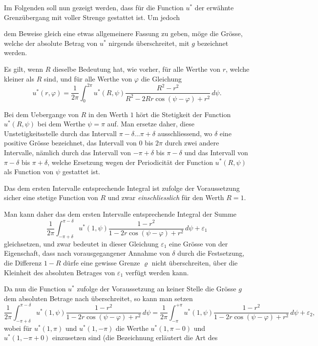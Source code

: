 \documentclass{article}
\begin{document}
Im Folgenden soll nun gezeigt werden, dass für die Function $u^*$ der erwähnte Grenzübergang mit voller Strenge gestattet ist. Um jedoch

dem Beweise gleich eine etwas allgemeinere Fassung zu geben, möge die Grösse, welche der absolute Betrag von $u^*$ nirgends überschreitet, mit $g$ bezeichnet werden.

Es gilt, wenn $R$ dieselbe Bedeutung hat, wie vorher, für alle Werthe von $r$, welche kleiner als $R$ sind, und für alle Werthe von $\varphi$ die Gleichung
\[
u^*(r, \varphi) = \frac{1}{2\pi} \int_0^{2\pi} u^*(R, \psi) \frac{R^2 - r^2}{R^2 - 2Rr \cos(\psi - \varphi) + r^2}\,d\psi.
\]

Bei dem Uebergange von $R$ in den Werth $1$ hört die Stetigkeit der Function $u^*(R, \psi)$ bei dem Werthe $\psi = \pi$ auf. Man ersetze daher, diese Unstetigkeitsstelle durch das Intervall $\pi - \delta \dots \pi + \delta$ ausschliessend, wo $\delta$ eine positive Grösse bezeichnet, das Intervall von $0$ bis $2\pi$ durch zwei andere Intervalle, nämlich durch das Intervall von $-\pi + \delta$ bis $\pi - \delta$ und das Intervall von $\pi - \delta$ bis $\pi + \delta$, welche Ersetzung wegen der Periodicität der Function $u^*(R, \psi)$ als Function von $\psi$ gestattet ist.

Das dem ersten Intervalle entsprechende Integral ist zufolge der Voraussetzung sicher eine stetige Function von $R$ und zwar \emph{einschliesslich} für den Werth $R = 1$.

Man kann daher das dem ersten Intervalle entsprechende Integral der Summe
\[
\frac{1}{2\pi} \int_{-\pi+\delta}^{\pi-\delta} u^*(1, \psi) \frac{1 - r^2}{1 - 2r \cos(\psi - \varphi) + r^2}\,d\psi + \varepsilon_1
\]
gleichsetzen, und zwar bedeutet in dieser Gleichung $\varepsilon_1$ eine Grösse von der Eigenschaft, dass nach vorausgegangener Annahme von $\delta$ durch die Festsetzung, die Differenz $1 - R$ dürfe eine gewisse Grenze $\varrho$ nicht überschreiten, über die Kleinheit des absoluten Betrages von $\varepsilon_1$ verfügt werden kann.

Da nun die Function $u^*$ zufolge der Voraussetzung an keiner Stelle die Grösse $g$ dem absoluten Betrage nach überschreitet, so kann man setzen
\[
\frac{1}{2\pi} \int_{-\pi+\delta}^{\pi-\delta} u^*(1, \psi) \frac{1 - r^2}{1 - 2r \cos(\psi - \varphi) + r^2}\,d\psi = \frac{1}{2\pi} \int_{-\pi}^{+\pi} u^*(1, \psi) \frac{1 - r^2}{1 - 2r \cos(\psi - \varphi) + r^2}\,d\psi + \varepsilon_2,
\]
wobei für $u^*(1, \pi)$ und $u^*(1, -\pi)$ die Werthe $u^*(1, \pi - 0)$ und $u^*(1, -\pi + 0)$ einzusetzen sind (die Bezeichnung erläutert die Art des
\end{document}
